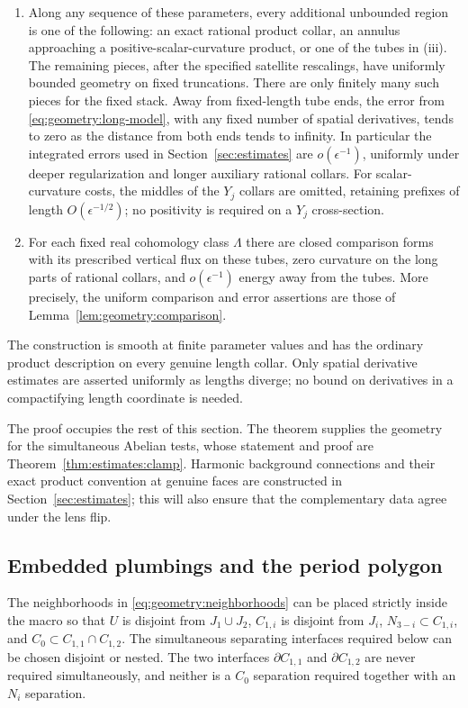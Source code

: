 \begin{theorem}
\begin{enumerate}[label=\textup{(\roman*)}]
The tubes lie in $C_0$ and are disjoint from both middle spheres $J_i$.
\item Along any sequence of these parameters, every additional
unbounded region is one of the following: an exact rational product
collar, an annulus approaching a positive-scalar-curvature product, or
one of the tubes in \textup{(iii)}.  The remaining pieces, after the
specified satellite rescalings, have uniformly bounded geometry on
fixed truncations.  There are only finitely many such pieces for the
fixed stack.  Away from fixed-length tube ends, the error from
\eqref{eq:geometry:long-model}, with any fixed number of spatial
derivatives, tends to zero as the distance from both ends tends to
infinity.  In particular the integrated errors used in
Section~\ref{sec:estimates} are $o(\epsilon^{-1})$, uniformly under
deeper regularization and longer auxiliary rational collars.
For scalar-curvature costs, the middles of the $Y_j$ collars
are omitted, retaining prefixes of length $O(\epsilon^{-1/2})$;
no positivity is required on a $Y_j$ cross-section.
\item For each fixed real cohomology class $\Lambda$ there are closed
comparison forms with its prescribed vertical flux on these tubes,
zero curvature on the long parts of rational collars, and
$o(\epsilon^{-1})$ energy away from the tubes.  More precisely, the
uniform comparison and error assertions are those of
Lemma~\ref{lem:geometry:comparison}.
\end{enumerate}
The construction is smooth at finite parameter values and has the
ordinary product description on every genuine length collar.  Only
spatial derivative estimates are asserted uniformly as lengths diverge;
no bound on derivatives in a compactifying length coordinate is needed.
\end{theorem}

The proof occupies the rest of this section.  The theorem supplies the
geometry for the simultaneous Abelian tests, whose statement and proof
are Theorem~\ref{thm:estimates:clamp}.  Harmonic background connections
and their exact product convention at genuine faces are constructed in
Section~\ref{sec:estimates}; this will also ensure that the complementary
data agree under the lens flip.

\subsection{Embedded plumbings and the period polygon}

\begin{lemma}
\label{lem:geometry:plumbing}
The neighborhoods in \eqref{eq:geometry:neighborhoods} can be placed
strictly inside the macro so that $U$ is disjoint from $J_1\cup J_2$,
$C_{1,i}$ is disjoint from $J_i$, $N_{3-i}\subset C_{1,i}$, and
$C_0\subset C_{1,1}\cap C_{1,2}$.  The simultaneous separating
interfaces required below can be chosen disjoint or nested.  The two
interfaces $\partial C_{1,1}$ and $\partial C_{1,2}$ are never required
simultaneously, and neither is a $C_0$ separation required together
with an $N_i$ separation.
\end{lemma}

